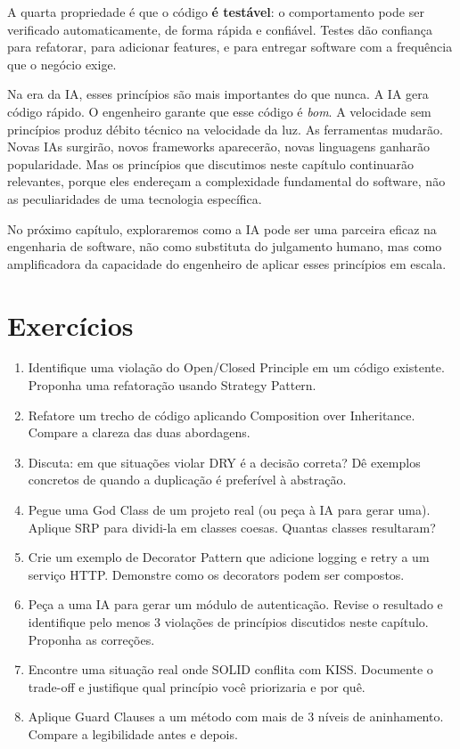 A quarta propriedade é que o código \textbf{é testável}: o comportamento pode
ser verificado automaticamente, de forma rápida e confiável. Testes dão
confiança para refatorar, para adicionar features, e para entregar software
com a frequência que o negócio exige.

Na era da IA, esses princípios são mais importantes do que nunca. A IA gera
código rápido. O engenheiro garante que esse código é \emph{bom}. A velocidade
sem princípios produz débito técnico na velocidade da luz. As ferramentas
mudarão. Novas IAs surgirão, novos frameworks aparecerão, novas linguagens
ganharão popularidade. Mas os princípios que discutimos neste capítulo
continuarão relevantes, porque eles endereçam a complexidade fundamental do
software, não as peculiaridades de uma tecnologia específica.

No próximo capítulo, exploraremos como a IA pode ser uma parceira eficaz na
engenharia de software, não como substituta do julgamento humano, mas como
amplificadora da capacidade do engenheiro de aplicar esses princípios em
escala.


\section*{Exercícios}

\begin{enumerate}
    \item Identifique uma violação do Open/Closed Principle em um código existente.
    Proponha uma refatoração usando Strategy Pattern.

    \item Refatore um trecho de código aplicando Composition over Inheritance.
    Compare a clareza das duas abordagens.

    \item Discuta: em que situações violar DRY é a decisão correta? Dê exemplos
    concretos de quando a duplicação é preferível à abstração.

    \item Pegue uma God Class de um projeto real (ou peça à IA para gerar uma).
    Aplique SRP para dividi-la em classes coesas. Quantas classes resultaram?

    \item Crie um exemplo de Decorator Pattern que adicione logging e retry a um
    serviço HTTP. Demonstre como os decorators podem ser compostos.

    \item Peça a uma IA para gerar um módulo de autenticação. Revise o resultado
    e identifique pelo menos 3 violações de princípios discutidos neste capítulo.
    Proponha as correções.

    \item Encontre uma situação real onde SOLID conflita com KISS. Documente o
    trade-off e justifique qual princípio você priorizaria e por quê.

    \item Aplique Guard Clauses a um método com mais de 3 níveis de aninhamento.
    Compare a legibilidade antes e depois.
\end{enumerate}
